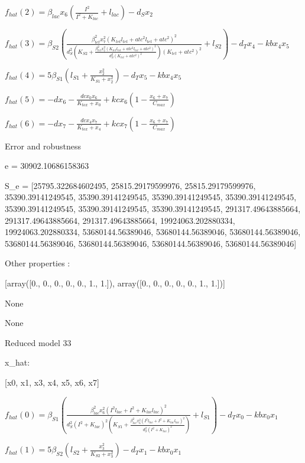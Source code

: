 $f_{hat}(2)=\beta_{lac} x_{6} \left(\frac{I^{2}}{I^{2} + K_{lac}} + l_{lac}\right) - d_{S} x_{2}$


$f_{hat}(3)=\beta_{S2} \left(\frac{\beta_{tet}^{2} x_{7}^{2} \left(K_{tet} l_{tet} + atc^{2} l_{tet} + atc^{2}\right)^{2}}{d_{S}^{2} \left(K_{S2} + \frac{\beta_{tet}^{2} x_{7}^{2} \left(K_{tet} l_{tet} + atc^{2} l_{tet} + atc^{2}\right)^{2}}{d_{S}^{2} \left(K_{tet} + atc^{2}\right)^{2}}\right) \left(K_{tet} + atc^{2}\right)^{2}} + l_{S2}\right) - d_{T} x_{4} - kb x_{4} x_{5}$


$f_{hat}(4)=5 \beta_{S1} \left(l_{S1} + \frac{x_{2}^{2}}{K_{S1} + x_{2}^{2}}\right) - d_{T} x_{5} - kb x_{4} x_{5}$


$f_{hat}(5)=- d x_{6} - \frac{dc x_{0} x_{6}}{K_{tox} + x_{0}} + kc x_{6} \left(1 - \frac{x_{6} + x_{7}}{C_{max}}\right)$


$f_{hat}(6)=- d x_{7} - \frac{dc x_{4} x_{7}}{K_{tox} + x_{4}} + kc x_{7} \left(1 - \frac{x_{6} + x_{7}}{C_{max}}\right)$



Error and robustness 


e = 30902.10686158363

S_e = [25795.322684602495, 25815.29179599976, 25815.29179599976, 35390.39141249545, 35390.39141249545, 35390.39141249545, 35390.39141249545, 35390.39141249545, 35390.39141249545, 35390.39141249545, 291317.49643885664, 291317.49643885664, 291317.49643885664, 19924063.202880334, 19924063.202880334, 53680144.56389046, 53680144.56389046, 53680144.56389046, 53680144.56389046, 53680144.56389046, 53680144.56389046, 53680144.56389046]

Other properties :


[array([0., 0., 0., 0., 0., 1., 1.]), array([0., 0., 0., 0., 0., 1., 1.])]

None

None

Reduced model 33

x_{hat}: 

[x0, x1, x3, x4, x5, x6, x7]


$f_{hat}(0)=\beta_{S1} \left(\frac{\beta_{lac}^{2} x_{6}^{2} \left(I^{2} l_{lac} + I^{2} + K_{lac} l_{lac}\right)^{2}}{d_{S}^{2} \left(I^{2} + K_{lac}\right)^{2} \left(K_{S1} + \frac{\beta_{lac}^{2} x_{6}^{2} \left(I^{2} l_{lac} + I^{2} + K_{lac} l_{lac}\right)^{2}}{d_{S}^{2} \left(I^{2} + K_{lac}\right)^{2}}\right)} + l_{S1}\right) - d_{T} x_{0} - kb x_{0} x_{1}$


$f_{hat}(1)=5 \beta_{S2} \left(l_{S2} + \frac{x_{3}^{2}}{K_{S2} + x_{3}^{2}}\right) - d_{T} x_{1} - kb x_{0} x_{1}$



